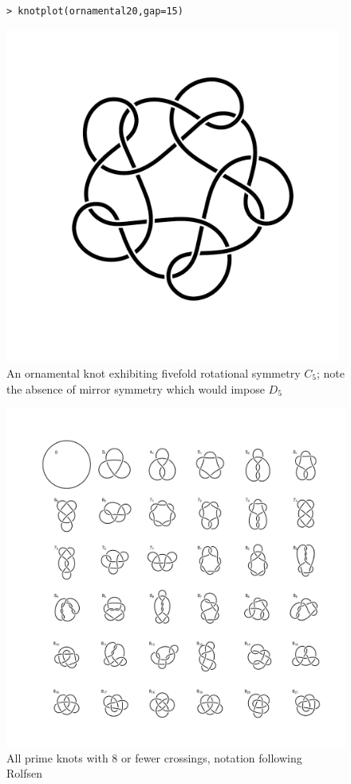 \documentclass{birkjour}
\theoremstyle{definition}
\theoremstyle{remark}
\numberwithin{equation}{section}
\begin{document}
\begin{figure}[htbp]
  \begin{center}
\begin{verbatim}
> knotplot(ornamental20,gap=15)
\end{verbatim}
\includegraphics[width=11cm]{knot-ornamental}
\caption{An ornamental knot exhibiting fivefold
  rotational \label{orn20} symmetry $C_5$; note the absence of mirror
  symmetry which would impose $D_5$}
  \end{center}
\end{figure}

\begin{figure}[htbp]
  \begin{center}
\includegraphics[width=13cm]{knots_to_8crossings}  %
\caption{All \label{all8} prime knots with 8 or fewer crossings,
notation following Rolfsen~\cite{rolfsen1976}}
  \end{center}
\end{figure}




\end{document}
